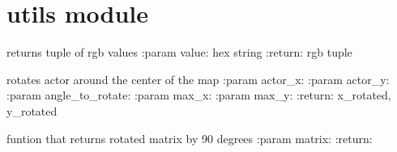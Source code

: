 \documentclass[letterpaper,10pt,english]{sphinxmanual}
\begin{document}
\sphinxstepscope


\section{utils module}
\label{\detokenize{utils:module-utils}}\label{\detokenize{utils:utils-module}}\label{\detokenize{utils::doc}}

\begin{fulllineitems}
\label{\detokenize{utils:utils.hex_to_rgb}}
\pysigstartsignatures
{}
\pysigstopsignatures
\sphinxAtStartPar
returns tuple of rgb values
:param value: hex string
:return: rgb tuple

\end{fulllineitems}


\begin{fulllineitems}
\label{\detokenize{utils:utils.return_rotated_actor_position}}
\pysigstartsignatures
{}
\pysigstopsignatures
\sphinxAtStartPar
rotates actor around the center of the map
:param actor\_x:
:param actor\_y:
:param angle\_to\_rotate:
:param max\_x:
:param max\_y:
:return: x\_rotated, y\_rotated

\end{fulllineitems}


\begin{fulllineitems}
\label{\detokenize{utils:utils.return_rotated_matrix}}
\pysigstartsignatures
{}
\pysigstopsignatures
\sphinxAtStartPar
funtion that returns rotated matrix by 90 degrees
:param matrix:
:return:

\end{fulllineitems}
\end{document}
